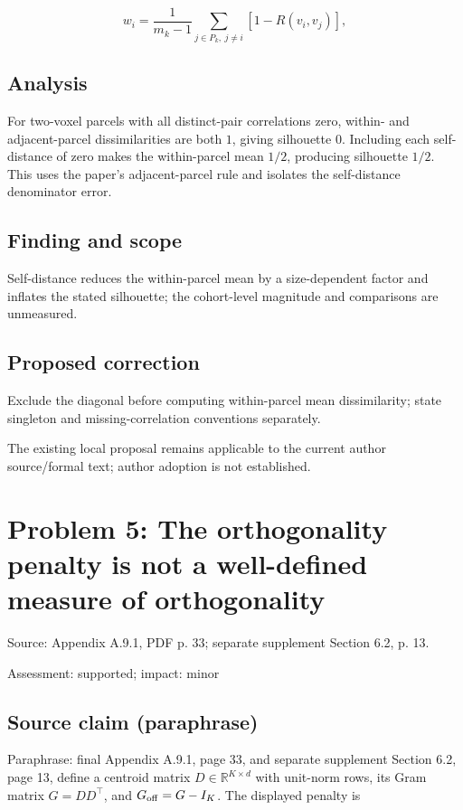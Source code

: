 \documentclass[11pt]{article}
\begin{document}
\[w_i=\frac1{m_k-1}\sum_{j\in P_k,\ j\ne i}[1-R(v_i,v_j)],\]

\subsection*{Analysis}

For two-voxel parcels with all distinct-pair correlations zero, within- and adjacent-parcel dissimilarities are both \(1\), giving silhouette \(0\). Including each self-distance of zero makes the within-parcel mean \(1/2\), producing silhouette \(1/2\). This uses the paper's adjacent-parcel rule and isolates the self-distance denominator error.

\subsection*{Finding and scope}

Self-distance reduces the within-parcel mean by a size-dependent factor and inflates the stated silhouette; the cohort-level magnitude and comparisons are unmeasured.

\subsection*{Proposed correction}

Exclude the diagonal before computing within-parcel mean dissimilarity; state singleton and missing-correlation conventions separately.

The existing local proposal remains applicable to the current author source/formal text; author adoption is not established.

\section*{Problem 5: The orthogonality penalty is not a well-defined measure of orthogonality}

Source: Appendix A.9.1, PDF p. 33; separate supplement Section 6.2, p. 13.

Assessment: supported; impact: minor

\subsection*{Source claim (paraphrase)}

Paraphrase: final Appendix A.9.1, page 33, and separate supplement Section 6.2, page 13, define a centroid matrix \(D\in\mathbb R^{K\times d}\) with unit-norm rows, its Gram matrix \(G=DD^\top\), and \(G_{\rm off}=G-I_K\). The displayed penalty is
\end{document}
